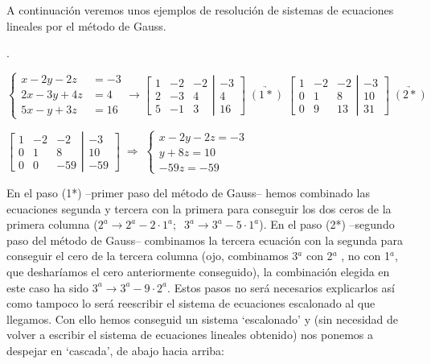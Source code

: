 A continuación veremos unos ejemplos de resolución de sistemas de ecuaciones lineales por el método de Gauss.

\begin{ejem}.

$\begin{cases}
x-2y-2z&=-3\\2x-3y+4z&=4\\5x-y+3z&=16	
\end{cases} \to \left[ \begin{matrix}
 1&-2&-2\\2&-3&4\\5&-1&3	
 \end{matrix}\right. 
 \left| \begin{matrix}
 -3\\4\\16	
 \end{matrix}\right] \; \underrightarrow {(1*)} \;  
 \left[ \begin{matrix}
 1&-2&-2\\0&1&8\\0&9&13	
 \end{matrix}\right. 
 \left| \begin{matrix}
 -3\\10\\31	
 \end{matrix}\right] \; \underrightarrow {(2*)} \; $
 
 $
  \left[ \begin{matrix}
 1&-2&-2\\0&1&8\\0&0&-59	
 \end{matrix}\right. 
 \left| \begin{matrix}
 -3\\10\\-59	
 \end{matrix}\right] \;  \Rightarrow  \; \begin{cases}
 x-2y-2z=-3\\ y+8z=10\\-59z=-59	
 \end{cases}$

En el paso (1*) --primer paso del método de Gauss-- hemos combinado las ecuaciones segunda y tercera con la primera para conseguir los dos ceros de la primera columna ($2^a\to 2^a-2\cdot 1^a; \; \; 3^a\to 3^a-5\cdot 1^a$). En el paso (2*) --segundo paso del método de Gauss-- combinamos la tercera ecuación con la segunda para conseguir el cero de la tercera columna \textcolor{gris}{(ojo, combinamos 3$^a$ con 2$^a$ , no con 1$^a$, que desharíamos el cero anteriormente conseguido)}, la combinación elegida en este caso ha sido $3^a \to 3^a - 9\cdot 2^a$. \textcolor{gris}{Estos pasos no será necesarios explicarlos así como tampoco lo será reescribir el sistema de ecuaciones escalonado al que llegamos}. Con ello hemos conseguid un sistema `escalonado' y (sin necesidad de volver a escribir el sistema de ecuaciones lineales obtenido) nos ponemos a despejar en `cascada', de abajo hacia arriba: 


\end{ejem}
